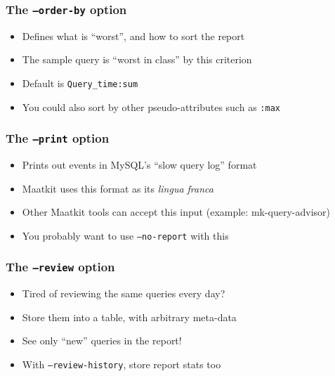 \begin{frame}
   \frametitle{The \texttt{--order-by} option}
   \begin{itemize}
      \item Defines what is ``worst'', and how to sort the report
      \item The sample query is ``worst in class'' by this criterion
      \item Default is \texttt{Query\_time:sum}
      \item You could also sort by other pseudo-attributes such as \texttt{:max}
   \end{itemize}
\end{frame}

\begin{frame}
   \frametitle{The \texttt{--print} option}
   \begin{itemize}
      \item Prints out events in MySQL's ``slow query log'' format
      \item Maatkit uses this format as its \emph{lingua franca}
      \item Other Maatkit tools can accept this input (example: mk-query-advisor)
      \item You probably want to use \texttt{--no-report} with this
   \end{itemize}
\end{frame}

\begin{frame}
   \frametitle{The \texttt{--review} option}
   \begin{itemize}
      \item Tired of reviewing the same queries every day?
      \item Store them into a table, with arbitrary meta-data
      \item See only ``new'' queries in the report!
      \item With \texttt{--review-history}, store report stats too
   \end{itemize}
\end{frame}
